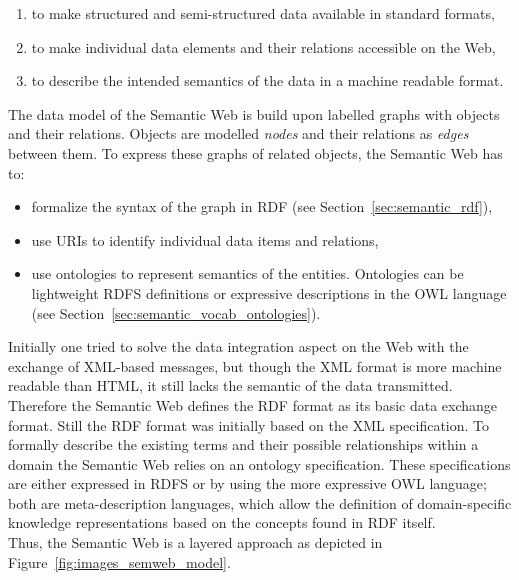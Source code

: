 \begin{enumerate}
	\item to make structured and semi-structured data available in standard formats,
	\item to make individual data elements and their relations accessible on the Web,
	\item to describe the intended semantics of the data in a machine readable format.
\end{enumerate}

The data model of the Semantic Web is build upon labelled graphs with objects and their relations. Objects are modelled \emph{nodes} and their relations as \emph{edges} between them. To express these graphs of related objects, the Semantic Web has to: \@

\begin{itemize}
	\item formalize the syntax of the graph in \gls{RDF} (see Section~\ref{sec:semantic_rdf}),
	\item use \gls{URI}s to identify individual data items and relations,
	\item use ontologies to represent semantics of the entities. Ontologies can be lightweight \gls{RDFS} definitions or expressive descriptions in the \gls{OWL} language (see Section~\ref{sec:semantic_vocab_ontologies}).
\end{itemize}

Initially one tried to solve the data integration aspect on the Web with the exchange of \gls{XML}-based messages, but though the \gls{XML} format is more machine readable than \gls{HTML}, it still lacks the semantic of the data transmitted. Therefore the Semantic Web defines the \gls{RDF} format as its basic data exchange format. Still the \gls{RDF} format was initially based on the \gls{XML} specification. To formally describe the existing terms and their possible relationships within a domain the Semantic Web relies on an ontology specification. These specifications are either expressed in \gls{RDFS} or by using the more expressive \gls{OWL} language; both are meta-description languages, which allow the definition of domain-specific knowledge representations based on the concepts found in \gls{RDF} itself. \\

Thus, the Semantic Web is a layered approach as depicted in Figure~\ref{fig:images_semweb_model}.\@

